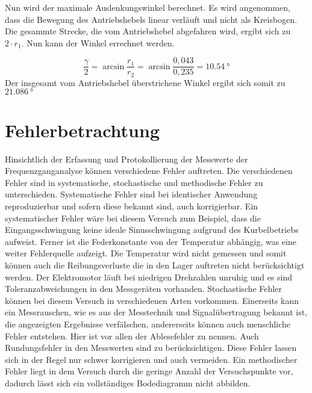 \documentclass[a4paper,12pt]{scrartcl}
\begin{document}
Nun wird der maximale Auslenkungswinkel \gamma berechnet. Es wird angenommen, dass die Bewegung des Antriebshebels linear verläuft und nicht als Kreisbogen.
Die gesammte Strecke, die vom Antriebshebel abgefahren wird, ergibt sich zu $2 \cdot r_1$. Nun kann der Winkel \gamma errechnet werden.

\begin{equation}
	\frac{\gamma}{2} = \arcsin{\frac{r_1}{r_2}} = \arcsin{\frac{0,043}{0,235}} =  \SI{10,54}{\degree}
\end{equation}
Der insgesamt vom Antriebshebel überstrichene Winkel \gamma ergibt sich somit zu $\SI{21,086}{\degree}$

\section{Fehlerbetrachtung}
Hinsichtlich der Erfassung und Protokollierung der Messwerte der Frequenzganganalyse können verschiedene Fehler auftreten. 
Die verschiedenen Fehler sind in systematische, stochastische und methodische Fehler zu unterschieden. 
Systematische Fehler sind bei identischer Anwendung reproduzierbar und sofern diese bekannt sind, auch korrigierbar.
Ein systematischer Fehler wäre bei diesem Versuch zum Beispiel, dass die Eingangsschwingung keine ideale Sinusschwingung aufgrund des Kurbelbetriebs aufweist.
Ferner ist die Federkonstante von der Temperatur abhängig, was eine weiter Fehlerquelle aufzeigt. 
Die Temperatur wird nicht gemessen und somit können auch die Reibungsverluste die in den Lager auftreten nicht berücksichtigt werden.
Der Elektromotor läuft bei niedrigen Drehzahlen unruhig und es sind Toleranzabweichungen in den Messgeräten vorhanden.
Stochastische Fehler können bei diesem Versuch in verschiedenen Arten vorkommen. Einerseits kann ein Messrauschen,
wie es aus der Messtechnik und Signalübertragung bekannt ist, die angezeigten Ergebnisse verfälschen, andererseits können auch menschliche Fehler entstehen.
Hier ist vor allen der Ablesefehler zu nennen. Auch Rundungsfehler in den Messwerten sind zu berücksichtigen. 
Diese Fehler lassen sich in der Regel nur schwer korrigieren und auch vermeiden. 
Ein methodischer Fehler liegt in dem Versuch durch die geringe Anzahl der Versuchspunkte vor, dadurch lässt sich ein vollständiges Bodediagramm nicht abbilden. 
\end{document}
